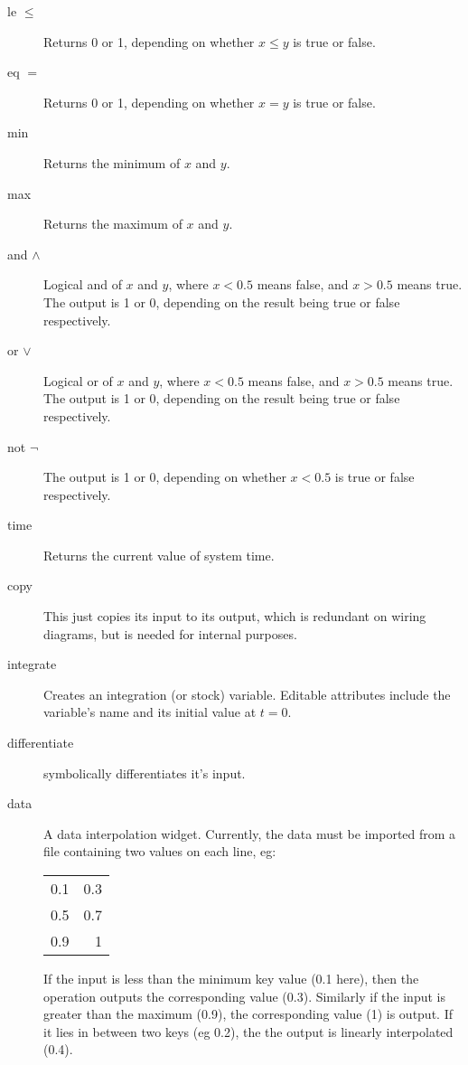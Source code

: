 \begin{description}
\item[le $\le$]\label{op:le} Returns 0 or 1, depending
  on whether $x\le y$ is true or false.

\item[eq $=$]\label{op:eq} Returns 0 or 1, depending
  on whether $x=y$ is true or false.

\item[min]\label{op:min} Returns the minimum of $x$ and $y$.

\item[max]\label{op:max} Returns the maximum of $x$ and $y$.

\item[and $\wedge$]\label{op:and_} Logical and of $x$ and $y$, where $x<0.5$
  means false, and $x>0.5$ means true. The output is 1 or 0, depending
  on the result being true or false respectively.

\item[or $\vee$]\label{op:or_} Logical or of $x$ and $y$, where $x<0.5$
  means false, and $x>0.5$ means true. The output is 1 or 0, depending
  on the result being true or false respectively.

\item[not $\neg$]\label{op:not_} The output is 1 or 0, depending
  on whether $x<0.5$ is true or false respectively.

\item[time]\label{op:time} Returns the current value of system time.

\item[copy]\label{op:copy} This just copies its input to its output,
which is redundant on wiring diagrams, but is needed for internal
purposes.

\item[integrate]\label{op:integrate} Creates an integration (or stock)
variable. Editable attributes include the variable's name and its
initial value at $t=0$.

\item[differentiate]\label{op:differentiate} symbolically differentiates it's input.

\item[data]\label{op:data} A data interpolation widget. Currently, the
data must be imported from a file containing two values on each line,
eg:
\begin{tabular}{rr}
0.1 &0.3\\
0.5 &0.7\\
0.9 &1\\
\end{tabular}
If the input is less than the minimum key value (0.1 here), then the
operation outputs the corresponding value (0.3). Similarly if the
input is greater than the maximum (0.9), the corresponding value (1)
is output. If it lies in between two keys (eg 0.2), the the output is
linearly interpolated (0.4).


\end{description}
